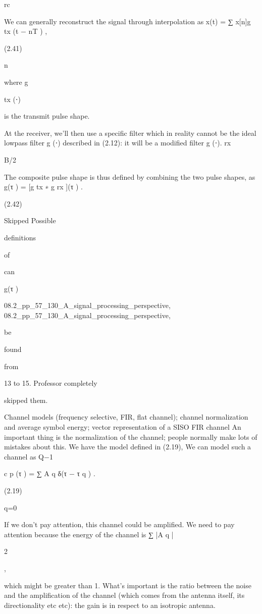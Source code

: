 {rc

We can generally reconstruct the signal through interpolation as x(t) = ∑ x[n]g tx (t − nT ) ,

(2.41)

n

where g

tx (⋅)

is the transmit pulse shape.

At the receiver, we'll then use a specific filter which in reality cannot be the ideal lowpass filter g (⋅) described in (2.12): it will be a modified filter g (⋅).
rx

B/2

The composite pulse shape is thus defined by combining the two pulse shapes, as g(τ ) = [g tx ∗ g rx ](τ ) .

(2.42)

Skipped Possible

definitions

of

can

g(τ )

08.2_pp_57_130_A_signal_processing_perspective,
08.2_pp_57_130_A_signal_processing_perspective,

be

found

from

13 to 15. Professor completely

skipped them.

Channel models (frequency selective, FIR, flat channel);
channel normalization and average symbol energy; vector representation of a SISO FIR channel An important thing is the normalization of the channel; people normally make lots of mistakes about this.
We have the model defined in (2.19),
We can model such a channel as Q−1

c p (τ ) = ∑ A q δ(τ − τ q ) .

(2.19)

q=0

If we don't pay attention, this channel could be amplified. We need to pay attention because the energy of the channel is
∑ |A q |

2

,

which might be greater than 1.
What's important is the ratio between the noise and the amplification of the channel
(which comes from the antenna itself, its directionality etc etc): the gain is in respect to an isotropic antenna.

}
